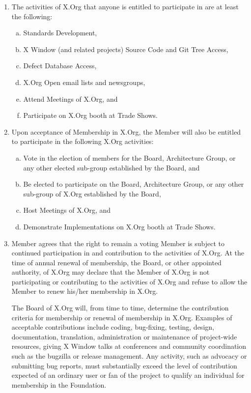 \documentclass[10pt, english]{xorgdocs}
\begin{document}
\begin{enumerate}[(1)\hspace{.2cm}]
	\item The activities of X.Org that anyone is entitled to participate
	in are at least the following:

	\begin{enumerate}[(a)\hspace{.2cm}]
		\item Standards Development,
		\item X Window (and related projects) Source Code and Git
		Tree Access,
		\item Defect Database Access,
		\item X.Org Open email lists and newsgroups,
		\item Attend Meetings of X.Org, and
		\item Participate on X.Org booth at Trade Shows.
	\end{enumerate}

	\item Upon acceptance of Membership in X.Org, the Member will also be
	entitled to participate in the following X.Org activities:

	\begin{enumerate}[(a)\hspace{.2cm}]
		\item Vote in the election of members for the Board,
		Architecture Group, or any other elected sub-group established
		by the Board, and
		\item Be elected to participate on the Board, Architecture
		Group, or any other sub-group of X.Org established by the
		Board,
		\item Host Meetings of X.Org, and
		\item Demonstrate Implementations on X.Org booth at Trade
		Shows.
	\end{enumerate}

	\item Member agrees that the right to remain a voting Member is
	subject to continued participation in and contribution to the
	activities of X.Org. At the time of annual renewal of membership,
	the Board, or other appointed authority, of X.Org may declare that
	the Member of X.Org is not participating or contributing to the
	activities of X.Org and refuse to allow the Member to renew his/her
	membership in X.Org.

	The Board of X.Org will, from time to time, determine the contribution
	criteria for membership or renewal of membership in X.Org. Examples
	of acceptable contributions include coding, bug-fixing, testing,
	design, documentation, translation, administration or maintenance of
	project-wide resources, giving X Window talks at conferences and
	community coordination such as the bugzilla or release management.
	Any activity, such as advocacy or submitting bug reports, must
	substantially exceed the level of contribution expected of an ordinary
	user or fan of the project to qualify an individual for membership in
	the Foundation.


\end{enumerate}
\end{document}
